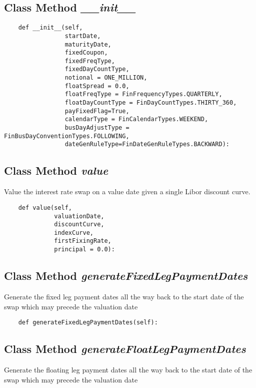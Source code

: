 \documentclass[twoside,11pt]{book}
\begin{document}
\subsection{Class Method {\it \_\_init\_\_}}


\begin{lstlisting}
    def __init__(self, 
                 startDate, 
                 maturityDate,
                 fixedCoupon, 
                 fixedFreqType, 
                 fixedDayCountType,
                 notional = ONE_MILLION,
                 floatSpread = 0.0, 
                 floatFreqType = FinFrequencyTypes.QUARTERLY, 
                 floatDayCountType = FinDayCountTypes.THIRTY_360,
                 payFixedFlag=True,
                 calendarType = FinCalendarTypes.WEEKEND,
                 busDayAdjustType = FinBusDayConventionTypes.FOLLOWING,
                 dateGenRuleType=FinDateGenRuleTypes.BACKWARD):
\end{lstlisting}

\subsection{Class Method {\it value}}
Value the interest rate swap on a value date given a single Libor discount curve. 

\begin{lstlisting}
    def value(self, 
              valuationDate, 
              discountCurve, 
              indexCurve,
              firstFixingRate, 
              principal = 0.0):
\end{lstlisting}

\subsection{Class Method {\it generateFixedLegPaymentDates}}
Generate the fixed leg payment dates all the way back to the start date of the swap which may precede the valuation date

\begin{lstlisting}
    def generateFixedLegPaymentDates(self):
\end{lstlisting}

\subsection{Class Method {\it generateFloatLegPaymentDates}}
Generate the floating leg payment dates all the way back to the start date of the swap which may precede the valuation date
\end{document}
